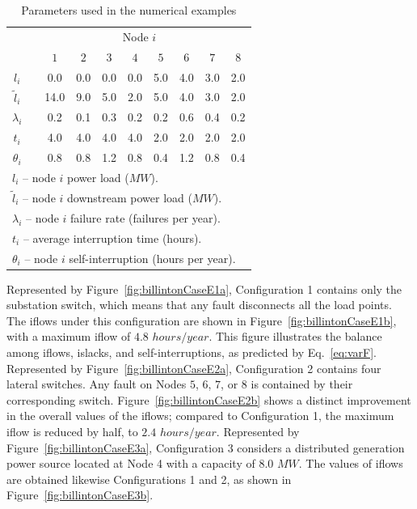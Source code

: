 \begin{table}[ht!]
\setlength{\tabcolsep}{6pt}
\caption{Parameters used in the numerical examples} \begin{center} {
\begin{tabular}{ c c c c c c c c c c } \label{tbl:billintonParameters}
\\ \hline
 &  \multicolumn{9}{c}{Node $i$} \\
 &  & $1$ & $2$ & $3$ & $4$ & $5$ & $6$ & $7$ & $8$ \\ \cline{3-10}
$l_i$ &  & 0.0 & 0.0 & 0.0 & 0.0 & 5.0 & 4.0 & 3.0 & 2.0 \\ 
$\tilde{l}_i$ &  & 14.0 & 9.0 & 5.0 & 2.0 & 5.0 & 4.0 & 3.0 & 2.0 \\ 
$\lambda_i$ &  & 0.2 & 0.1 & 0.3 & 0.2 & 0.2 & 0.6 & 0.4 & 0.2 \\ 
$t_i$ &  & 4.0 & 4.0 & 4.0 & 4.0 & 2.0 & 2.0 & 2.0 & 2.0 \\ 
$\theta_i$ &  & 0.8 & 0.8 & 1.2 & 0.8 & 0.4 & 1.2 & 0.8 & 0.4 \\ 
\hline
\multicolumn{10}{l}{$l_i$ -- node $i$ power load ($MW$).} \\
\multicolumn{10}{l}{$\tilde{l}_i$ -- node $i$ downstream power load ($MW$).} \\
\multicolumn{10}{l}{$\lambda_i$ -- node $i$ failure rate (failures per year).} \\
\multicolumn{10}{l}{$t_i$ -- average interruption time (hours).} \\
\multicolumn{10}{l}{$\theta_i$ -- node $i$ self-interruption (hours per year).} \\
\end{tabular} } 
\end{center} \end{table}

Represented by Figure~\ref{fig:billintonCaseE1a}, Configuration 1 contains only the substation switch, which means that any fault  disconnects all the load points. The iflows under this configuration are shown in Figure~\ref{fig:billintonCaseE1b}, with a maximum iflow of $4.8$ $hours/year$. This figure  illustrates the balance among iflows, islacks, and self-interruptions, as predicted by Eq.~\eqref{eq:varF}.
Represented by Figure~\ref{fig:billintonCaseE2a}, Configuration 2 contains four lateral switches. Any fault on Nodes $5$, $6$, $7$, or $8$ is contained by their corresponding switch. Figure~\ref{fig:billintonCaseE2b} shows a distinct improvement  in the overall values of the iflows; compared to Configuration 1, the maximum iflow is reduced by half, to $2.4$ $hours/year$.
Represented by Figure~\ref{fig:billintonCaseE3a}, Configuration 3 considers a distributed generation power source located at Node 4 with a capacity of $8.0$ $MW$. The values of iflows are obtained likewise Configurations 1 and 2, as shown in Figure~\ref{fig:billintonCaseE3b}. 

